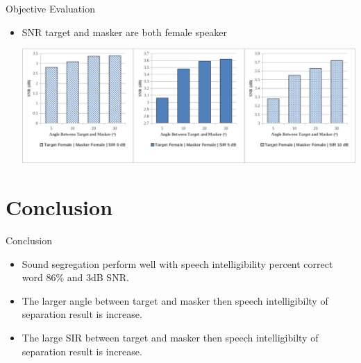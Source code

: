\documentclass{beamer}
\begin{document}
\begin{frame}[t]{Objective Evaluation}
\begin{itemize}
\item SNR target and masker are both female speaker
\begin{center}
    \includegraphics[scale=0.33]{../pict/snr_fena_fena.png}
\end{center}
\end{itemize}
\end{frame}

\section{Conclusion}
\begin{frame}[t]{Conclusion}
\begin{itemize}
\item Sound segregation perform well with speech intelligibility percent correct word 86\% and 3dB SNR.
\item The larger angle between target and masker then speech intelligibilty of separation result is increase.
\item The large SIR between target and masker then speech intelligibilty of separation result is increase.
\end{itemize}
\end{frame}

%
%
\end{document}
